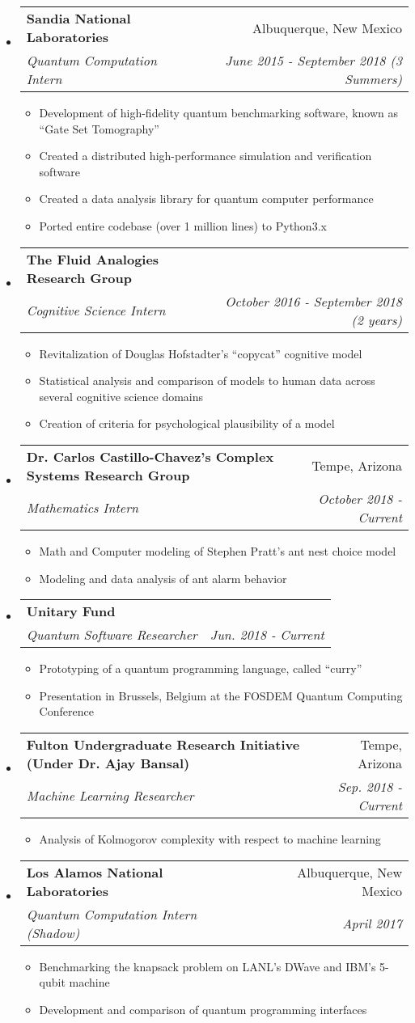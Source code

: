 \documentclass[letterpaper,11pt]{article}
\makeatletter
\newcommand{\resitem}[1]{\item #1 \vspace{-2pt}}
\newcommand{\resheading}[1]{{\large \parashade[.9]{sharpcorners}{\textbf{#1 \vphantom{p\^{E}}}}}}
\newcommand{\ressubheading}[4]{
\begin{tabular*}{6.5in}{l@{\extracolsep{\fill}}r}
		\textbf{#1} & #2 \\
		\textit{#3} & \textit{#4} \\
\end{tabular*}\vspace{-6pt}}
\makeatother
\begin{document}
\resheading{Work Experience}
\begin{itemize}
 \item
     \ressubheading{Sandia National Laboratories}{Albuquerque, New Mexico}{Quantum Computation Intern}{June 2015 - September 2018 (3 Summers)}
 	\begin{itemize}
            \resitem{Development of high-fidelity quantum benchmarking software, known as ``Gate Set Tomography''}
 		\resitem{Created a distributed high-performance simulation and verification software}
 		\resitem{Created a data analysis library for quantum computer performance}
        \resitem{Ported entire codebase (over 1 million lines) to Python3.x}
 	\end{itemize}
 \item
     \ressubheading{The Fluid Analogies Research Group}{}{Cognitive Science Intern}{October 2016 - September 2018 (2 years)}
 	\begin{itemize}
 		\resitem{Revitalization of Douglas Hofstadter's ``copycat'' cognitive model}
 		\resitem{Statistical analysis and comparison of models to human data across several cognitive science domains}
 		\resitem{Creation of criteria for psychological plausibility of a model}
 	\end{itemize}
 \item
     \ressubheading{Dr. Carlos Castillo-Chavez's Complex Systems Research Group}{Tempe, Arizona}{Mathematics Intern}{October 2018 - Current}
 	\begin{itemize}
 		\resitem{Math and Computer modeling of Stephen Pratt's ant nest choice model}
 		\resitem{Modeling and data analysis of ant alarm behavior}
 	\end{itemize}
 \item
     \ressubheading{Unitary Fund}{}{Quantum Software Researcher}{Jun. 2018 - Current}
 	\begin{itemize}
            \resitem{Prototyping of a quantum programming language, called ``curry''}
            \resitem{Presentation in Brussels, Belgium at the FOSDEM Quantum Computing Conference}
 	\end{itemize}
 \item
     \ressubheading{Fulton Undergraduate Research Initiative (Under Dr. Ajay Bansal)}{Tempe, Arizona}{Machine Learning Researcher}{Sep. 2018 - Current}
 	\begin{itemize}
 		\resitem{Analysis of Kolmogorov complexity with respect to machine learning}
 	\end{itemize}
 \item
     \ressubheading{Los Alamos National Laboratories}{Albuquerque, New Mexico}{Quantum Computation Intern (Shadow)}{April 2017}
 	\begin{itemize}
 		\resitem{Benchmarking the knapsack problem on LANL's DWave and IBM's 5-qubit machine}
 		\resitem{Development and comparison of quantum programming interfaces}
 	\end{itemize}
\end{itemize}
\end{document}
